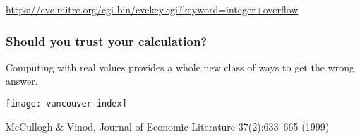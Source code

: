 \documentclass[presentation]{beamer}
\begin{document}
\begin{frame}[plain,t]
  \begin{flushright}
    \tiny \url{https://cve.mitre.org/cgi-bin/cvekey.cgi?keyword=integer+overflow}
  \end{flushright}
\end{frame}

\begin{frame}
  \frametitle{Should you trust your calculation?}

  Computing with real values provides a whole new class of ways to get
  the wrong answer.

  \begin{center}
    \texttt{[image: vancouver-index]}
  \end{center}
  \begin{flushright}
    {\scriptsize McCullogh \& Vinod, Journal of Economic Literature
    37(2):633--665 (1999)}
  \end{flushright}
\end{frame}
\end{document}
